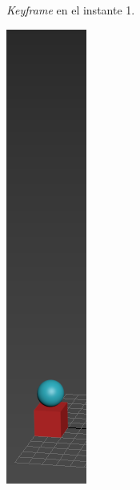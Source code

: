 \documentclass{article}
\begin{document}
\begin{figure}[H]
\begin{subfigure}[H]{0.15\textwidth}
	    \caption{\textit{Keyframe} en el instante 1.}
	\end{subfigure}   
    \hfill
	\begin{subfigure}[H]{0.15\textwidth}
	    \centering
	    \includegraphics[width=\textwidth]{imagenes/p1_ins15.png}

\end{subfigure}
\end{figure}
\end{document}

